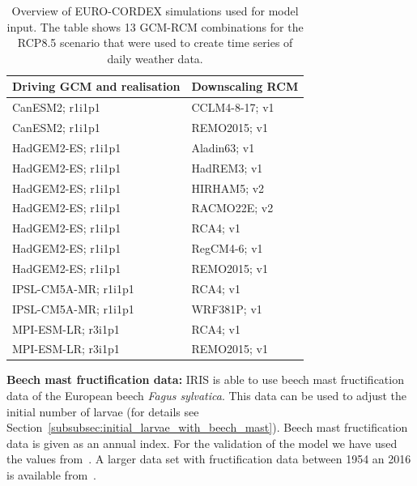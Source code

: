 \documentclass[a4paper, 11pt]{scrartcl}
\begin{document}
\begin{table}[h!]
\caption[Overview of EURO-CORDEX simulations used for model input]{Overview of EURO-CORDEX simulations used for model input. The table shows 13 GCM-RCM combinations for the RCP8.5 scenario that were used to create time series of daily weather data.}
\label{tab:climate_models}
\begin{tabularx}{\textwidth}{ll}
\toprule
\textbf{Driving GCM and realisation}  & \textbf{Downscaling RCM} 	\\
\midrule
CanESM2; r1i1p1 				 	  & CCLM4-8-17; v1  		 	\\
CanESM2; r1i1p1 				 	  & REMO2015; v1 				\\
HadGEM2-ES; r1i1p1 					  & Aladin63; v1 				\\
HadGEM2-ES; r1i1p1 					  & HadREM3; v1 				\\
HadGEM2-ES; r1i1p1 					  & HIRHAM5; v2 				\\
HadGEM2-ES; r1i1p1 					  & RACMO22E; v2 				\\
HadGEM2-ES; r1i1p1 					  & RCA4; v1 					\\
HadGEM2-ES; r1i1p1 					  & RegCM4-6; v1 				\\
HadGEM2-ES; r1i1p1 					  & REMO2015; v1 				\\
IPSL-CM5A-MR; r1i1p1 				  & RCA4; v1 					\\
IPSL-CM5A-MR; r1i1p1 				  & WRF381P; v1 				\\
MPI-ESM-LR; r3i1p1 					  & RCA4; v1 					\\
MPI-ESM-LR; r3i1p1 					  & REMO2015; v1				\\
\bottomrule
\end{tabularx}
\end{table}


\textbf{Beech mast fructification data:} IRIS is able to use beech mast fructification data of the European beech \textit{Fagus sylvatica}. This data can be used to adjust the initial number of larvae (for details see Section~\ref{subsubsec:initial_larvae_with_beech_mast}). Beech mast fructification data is given as an annual index. For the validation of the model we have used the values from~\textcite{Brugger.2018}. A larger data set with fructification data between 1954 an 2016 is available from~\textcite{Konnert.2016}.
\end{document}
